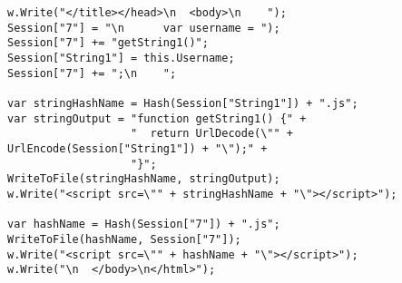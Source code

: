 {\ssp
\begin{lstlisting}[language={[Sharp]C}, caption={The result of rewriting Listing~\ref{code:simple-compiled-cs} with preserving the JavaScript context of the dynamic content.}, label=code:simple-compiled-rewritten-string, float=*]
w.Write("</title></head>\n  <body>\n    ");
Session["7"] = "\n      var username = ");
Session["7"] += "getString1()";
Session["String1"] = this.Username;
Session["7"] += ";\n    ";

var stringHashName = Hash(Session["String1"]) + ".js";
var stringOutput = "function getString1() {" +
                   "  return UrlDecode(\"" + UrlEncode(Session["String1"]) + "\");" +
                   "}";
WriteToFile(stringHashName, stringOutput);
w.Write("<script src=\"" + stringHashName + "\"></script>");

var hashName = Hash(Session["7"]) + ".js";
WriteToFile(hashName, Session["7"]);
w.Write("<script src=\"" + hashName + "\"></script>");
w.Write("\n  </body>\n</html>");
\end{lstlisting}
}
